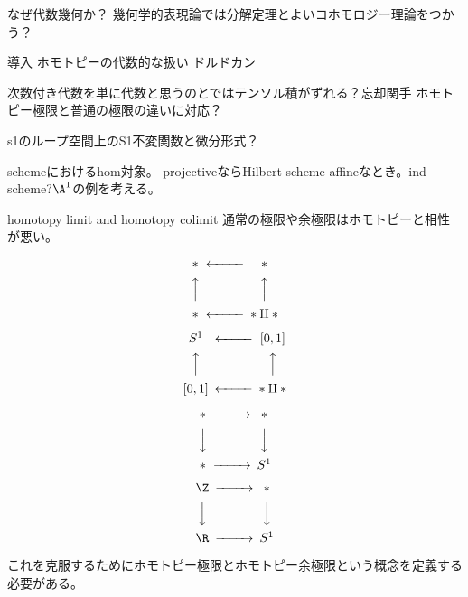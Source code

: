 \documentclass[dvipdfmx]{beamer}
\begin{document}
\begin{frame}
なぜ代数幾何か？
幾何学的表現論では分解定理とよいコホモロジー理論をつかう？

導入
ホモトピーの代数的な扱い
ドルドカン


次数付き代数を単に代数と思うのとではテンソル積がずれる？忘却関手
ホモトピー極限と普通の極限の違いに対応？

s1のループ空間上のS1不変関数と微分形式？

schemeにおけるhom対象。
projectiveならHilbert scheme
affineなとき。ind scheme?$\A^1$の例を考える。
\end{frame}


\begin{frame}{homotopy limit and homotopy colimit}
通常の極限や余極限はホモトピーと相性が悪い。

\begin{multicols}{2}
\[
\begin{CD}
\ast@<<<\ast\\
@AAA@AAA\\
\ast@<<<\ast\amalg\ast
\end{CD}
\]

\[
\begin{CD}
S^1@<<<[0,1]\\
@AAA@AAA\\
[0,1]@<<<\ast\amalg\ast
\end{CD}
\]
\end{multicols}


\begin{multicols}{2}
\[
\begin{CD}
\ast@>>>\ast\\
@VVV@VVV\\
\ast@>>>S^1
\end{CD}
\]

\[
\begin{CD}
\Z@>>>\ast\\
@VVV@VVV\\
\R@>>>S^1
\end{CD}
\]
\end{multicols}

これを克服するためにホモトピー極限とホモトピー余極限という概念を定義する必要がある。
\end{frame}
\end{document}
